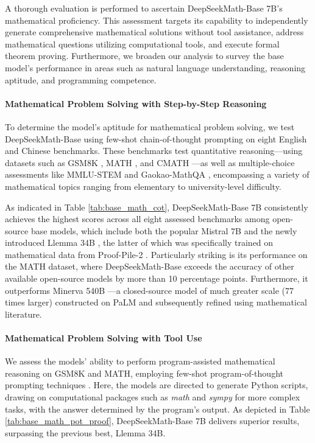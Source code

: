 A thorough evaluation is performed to ascertain DeepSeekMath-Base 7B's mathematical proficiency. This assessment targets its capability to independently generate comprehensive mathematical solutions without tool assistance, address mathematical questions utilizing computational tools, and execute formal theorem proving. Furthermore, we broaden our analysis to survey the base model’s performance in areas such as natural language understanding, reasoning aptitude, and programming competence.

\paragraph{Mathematical Problem Solving with Step-by-Step Reasoning}

To determine the model’s aptitude for mathematical problem solving, we test DeepSeekMath-Base using few-shot chain-of-thought prompting \citep{cot} on eight English and Chinese benchmarks. These benchmarks test quantitative reasoning—using datasets such as GSM8K \citep{gsm8k}, MATH \citep{MATH}, and CMATH \citep{wei2023cmath}—as well as multiple-choice assessments like MMLU-STEM \citep{mmlu} and Gaokao-MathQA \citep{agieval}, encompassing a variety of mathematical topics ranging from elementary to university-level difficulty.

As indicated in Table \ref{tab:base_math_cot}, DeepSeekMath-Base 7B consistently achieves the highest scores across all eight assessed benchmarks among open-source base models, which include both the popular Mistral 7B \citep{mistral} and the newly introduced Llemma 34B \citep{llemma}, the latter of which was specifically trained on mathematical data from Proof-Pile-2 \citep{llemma}. Particularly striking is its performance on the MATH dataset, where DeepSeekMath-Base exceeds the accuracy of other available open-source models by more than 10 percentage points. Furthermore, it outperforms Minerva 540B \citep{minerva}—a closed-source model of much greater scale (77 times larger) constructed on PaLM \citep{palm} and subsequently refined using mathematical literature.

\paragraph{Mathematical Problem Solving with Tool Use} We assess the models' ability to perform program-assisted mathematical reasoning on GSM8K and MATH, employing few-shot program-of-thought prompting techniques \citep{pot,pal}. Here, the models are directed to generate Python scripts, drawing on computational packages such as \textit{math} and \textit{sympy} for more complex tasks, with the answer determined by the program’s output. As depicted in Table \ref{tab:base_math_pot_proof}, DeepSeekMath-Base 7B delivers superior results, surpassing the previous best, Llemma 34B.


